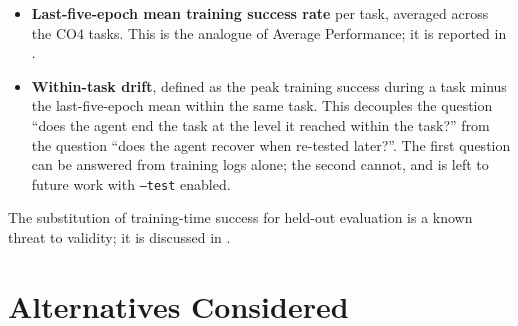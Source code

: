 \begin{itemize}
    \item \textbf{Last-five-epoch mean training success rate} per
        task, averaged across the CO4 tasks. This is the analogue
        of Average Performance; it is reported in .
    \item \textbf{Within-task drift}, defined as the peak
        training success during a task minus the last-five-epoch
        mean within the same task. This decouples the question
        ``does the agent end the task at the level it reached
        within the task?'' from the question ``does the agent
        recover when re-tested later?''. The first question can be
        answered from training logs alone; the second cannot, and
        is left to future work with \texttt{--test} enabled.
\end{itemize}

The substitution of training-time success for held-out evaluation
is a known threat to validity; it is discussed in
.

\section{Alternatives Considered}
\label{sec:alts}

